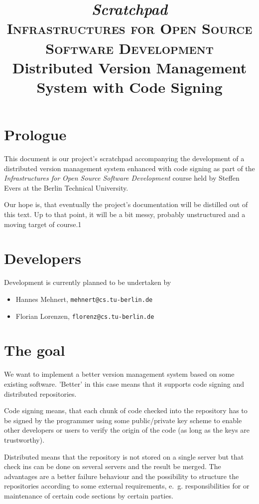 \documentclass[german, 10pt, a4paper]{article}
\begin{document}
\title{\emph{Scratchpad}\\
{\scshape Infrastructures for Open Source Software Development}\\
Distributed Version Management System with Code Signing}
\maketitle

\section{Prologue}
This document is our project's scratchpad accompanying the development
of a distributed version management system enhanced with code signing as
part of the \emph{Infrastructures for Open Source Software Development}
course held by Steffen Evers at the Berlin Technical University.

Our hope is, that eventually the project's documentation will be
distilled out of this text. Up to that point, it will be a bit messy,
probably unstructured and a moving target of course.1

\section{Developers}
Development is currently planned to be undertaken by
\begin{itemize}
\item Hannes Mehnert, \texttt{mehnert@cs.tu-berlin.de}
\item Florian Lorenzen, \texttt{florenz@cs.tu-berlin.de}
\end{itemize}

\section{The goal}
We want to implement a better version management system based on
some existing software. 'Better' in this case means that it supports
code signing and distributed repositories.

Code signing means, that each chunk of code checked into the repository
has to be signed by the programmer using some public/private key scheme
to enable other developers or users to verify the origin of the code (as
long as the keys are trustworthy).

Distributed means that the repository is not stored on a single server
but that check ins can be done on several servers and the result be
merged. The advantages are a better failure behaviour and the
possibility to structure the repositories according to some external
requirements, e.~g. responsibilities for or maintenance of certain code
sections by certain parties.
\end{document}
